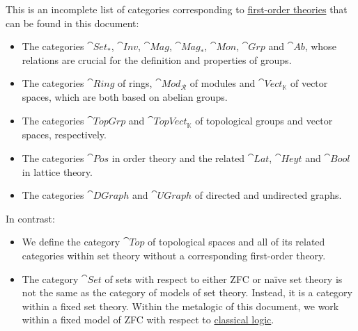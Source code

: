 \begin{example}\label{ex:def:category_of_first_order_models}
  This is an incomplete list of categories corresponding to \hyperref[def:first_order_theory]{first-order theories} that can be found in this document:
  \begin{itemize}
    \item The categories \hyperref[def:pointed_set/category]{\( \cat{Set}_* \)}, \hyperref[def:set_with_involution/category]{\( \cat{Inv} \)}, \hyperref[def:magma/category]{\( \cat{Mag} \)}, \hyperref[def:unital_magma/category]{\( \cat{Mag}_* \)}, \hyperref[def:unital_magma/associative]{\( \cat{Mon} \)}, \hyperref[def:group/category]{\( \cat{Grp} \)} and \hyperref[def:abelian_group]{\( \cat{Ab} \)}, whose relations are crucial for the definition and properties of groups.

    \item The categories \hyperref[def:semiring/ring]{\( \cat{Ring} \)} of rings, \hyperref[def:semiring/ring]{\( \cat{Mod}_\mscrR \)} of modules and \hyperref[def:vector_space]{\( \cat{Vect}_\BbbK \)} of vector spaces, which are both based on abelian groups.

    \item The categories \hyperref[def:category_of_topological_groups]{\( \cat{TopGrp} \)} and \hyperref[def:category_of_topological_groups]{\( \cat{TopVect}_\BbbK \)} of topological groups and vector spaces, respectively.

    \item The categories \hyperref[def:poset/category]{\( \cat{Pos} \)} in order theory and the related \hyperref[def:semilattice/category]{\( \cat{Lat} \)}, \hyperref[def:heyting_algebra/category]{\( \cat{Heyt} \)} and \hyperref[def:boolean_algebra/category]{\( \cat{Bool} \)} in lattice theory.

    \item The categories \hyperref[def:category_of_graphs]{\( \cat{DGraph} \)} and \hyperref[def:category_of_graphs]{\( \cat{UGraph} \)} of directed and undirected graphs.
  \end{itemize}

  In contrast:
  \begin{itemize}
    \item We define the category \hyperref[def:category_of_topological_spaces]{\( \cat{Top} \)}  of topological spaces and all of its related categories within set theory without a corresponding first-order theory.

    \item The category \hyperref[def:category_of_sets]{\( \cat{Set} \)} of sets with respect to either ZFC or na\"ive set theory is not the same as the category of models of set theory. Instead, it is a category within a fixed set theory. Within the metalogic of this document, we work within a fixed model of ZFC with respect to \hyperref[def:classical_logic]{classical logic}.


\end{itemize}
\end{example}

